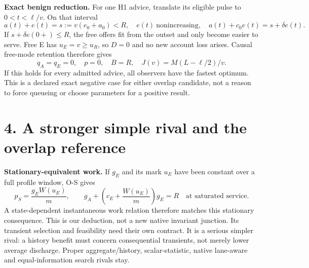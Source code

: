 \documentclass[11pt,a4paper]{article}
\begin{document}
\textbf{Exact benign reduction.} For one H1 advice, translate its eligible
pulse to $0<t<\ell/v$. On that interval
\begin{equation}
 a(t)+e(t)=s:=v(e_0+a_0)<R,\quad e(t)\ \text{nonincreasing},\quad
 a(t)+c_0e(t)=s+\delta e(t). \tag{12}
\end{equation}
If $s+\delta e(0+)\leq R$, the free offers fit from the outset and only
become easier to serve. Free E has $u_E=v\geq u_R$, so $D=0$ and no new
account loss arises. Causal free-mode retention therefore gives
\begin{equation}
 q_A=q_E=0,\quad p=0,\quad B=R,\quad
 J(v)=M(L-\ell/2)/v. \tag{13}
\end{equation}
If this holds for every admitted advice, all observers have the fastest
optimum. This is a declared exact negative case for either overlap candidate,
not a reason to force queueing or choose parameters for a positive result.

\newpage
\section*{4. A stronger simple rival and the overlap reference}

\textbf{Stationary-equivalent work.} If $g_E$ and its mark $u_E$ have
been constant over a full profile window, O-S gives
\begin{equation}
 p_S=\frac{g_EW(u_E)}m,\qquad
 g_A+\left(c_E+\frac{W(u_E)}m\right)g_E=R
 \quad\text{at saturated service}. \tag{14}
\end{equation}
A state-dependent instantaneous work relation therefore matches this
stationary consequence. This is our deduction, not a new native invariant
junction. Its transient selection and feasibility need their own contract.
It is a serious simpler rival: a history benefit must concern consequential
transients, not merely lower average discharge. Proper aggregate/history,
scalar-statistic, native lane-aware and equal-information search rivals stay.
\end{document}
